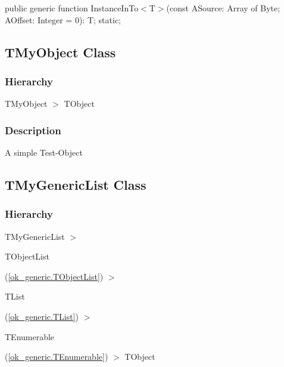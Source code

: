 \documentclass{report}
\begin{document}
\begin{list}{}{
\setlength{\itemindent}{0cm}
\setlength{\listparindent}{0cm}
\setlength{\leftmargin}{\evensidemargin}
\addtolength{\leftmargin}{\tmplength}
\settowidth{\labelsep}{X}
\addtolength{\leftmargin}{\labelsep}
\setlength{\labelwidth}{\tmplength}
}
\begin{flushleft}
\item[\textbf{Declaration}\hfill]
\begin{ttfamily}
public generic function InstanceInTo{$<$}T{$>$}(const ASource: Array of Byte; AOffset: Integer = 0): T; static;\end{ttfamily}


\end{flushleft}
\end{list}
\subsection*{TMyObject Class}
\subsubsection*{\large{\textbf{Hierarchy}}\normalsize\hspace{1ex}\hfill}
TMyObject {$>$} TObject
\subsubsection*{\large{\textbf{Description}}\normalsize\hspace{1ex}\hfill}
A simple Test{-}Object\subsection*{TMyGenericList Class}
\subsubsection*{\large{\textbf{Hierarchy}}\normalsize\hspace{1ex}\hfill}
TMyGenericList {$>$} \begin{ttfamily}TObjectList\end{ttfamily}(\ref{ok_generic.TObjectList}) {$>$} \begin{ttfamily}TList\end{ttfamily}(\ref{ok_generic.TList}) {$>$} \begin{ttfamily}TEnumerable\end{ttfamily}(\ref{ok_generic.TEnumerable}) {$>$} 
TObject
\end{document}
